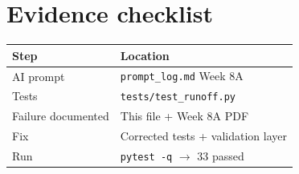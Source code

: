 \documentclass[11pt,a4paper]{article}
\begin{document}
\section{Evidence checklist}
\begin{tabular}{@{}ll@{}}
\toprule
Step & Location \\
\midrule
AI prompt & \texttt{prompt\_log.md} Week 8A \\
Tests & \texttt{tests/test\_runoff.py} \\
Failure documented & This file + Week 8A PDF \\
Fix & Corrected tests + validation layer \\
Run & \texttt{pytest -q} $\rightarrow$ 33 passed \\
\bottomrule
\end{tabular}
\end{document}
